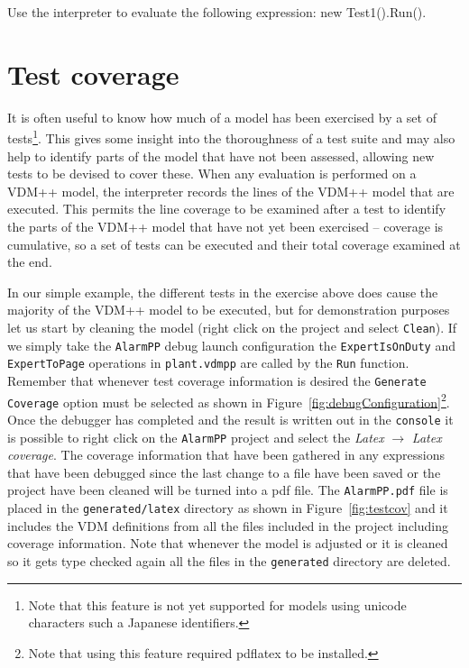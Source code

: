 \begin{myexercise}
\label{ex:tool-monitor}Use the interpreter to evaluate the
  following expression: {\ttfamily new Test1().Run()}.
\end{myexercise}



\section{Test coverage}\label{sec:testcov}

It is often useful to know how much of a model has been exercised by a
set of tests\footnote{Note that this feature is not yet supported for
  models using unicode characters such a Japanese identifiers.}.
This gives some insight into the thoroughness of a test
suite and may also help to identify parts of the model that have not
been assessed, allowing new tests to be devised to cover these. When
any evaluation is performed on a VDM++ model, the interpreter records
the lines of the VDM++ model that are executed. This permits the line
coverage to be examined after a test to identify the parts of the
VDM++ model that have not yet been exercised -- coverage is
cumulative, so a set of tests can be executed and their total coverage
examined at the end.

In our simple example, the different tests in the exercise above does
cause the majority of the VDM++ model to be executed, but for
demonstration purposes let us start by cleaning the model (right click
on the project and select \texttt{Clean}). If we simply take the
\texttt{AlarmPP} debug launch configuration the
\verb|ExpertIsOnDuty| and \verb|ExpertToPage| operations in
\verb|plant.vdmpp| are called by the
\texttt{Run} function. Remember that whenever test coverage
information is desired the \texttt{Generate Coverage} option
must be selected as shown in Figure~\ref{fig:debugConfiguration}\footnote{Note that using this feature
required pdflatex to be installed.}.
Once the debugger has completed and the result
is written out in the \texttt{console} it is possible to right click
on the \texttt{AlarmPP} project and select the \emph{Latex} $
\rightarrow $ \emph{Latex coverage}. The coverage information that have
been gathered in any expressions that have been debugged since the
last change to a file have been saved or the project have been cleaned
will be turned into a pdf file. The \texttt{AlarmPP.pdf} file is
placed in the \texttt{generated/latex} directory as shown in
Figure~\ref{fig:testcov} and it includes the
VDM definitions from all the files included in the project including
coverage information. Note that whenever the model is adjusted or it
is cleaned so it gets type checked again all the files in the
\texttt{generated} directory are deleted.

